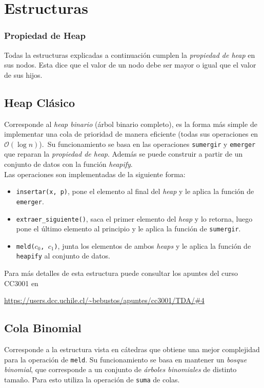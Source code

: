 \documentclass[dcc,uchile]{fcfmcourse}
\begin{document}
\section{Estructuras}
\subsubsection*{Propiedad de Heap}
Todas la estructuras explicadas a continuación cumplen la \textit{propiedad de heap} en sus nodos. Esta dice que el valor de un nodo debe ser mayor o igual que el valor de sus hijos.
\subsection{Heap Clásico}
Corresponde al \textit{heap binario} (árbol binario completo), es la forma más simple de implementar una cola de prioridad de manera eficiente (todas sus operaciones en $\mathcal{O}(\log{n})$).\ Su funcionamiento se basa en las operaciones \texttt{sumergir} y \texttt{emerger} que reparan la \textit{propiedad de heap}. Además se puede construir a partir de un conjunto de datos con la función \textit{heapify}.\\

Las operaciones son implementadas de la siguiente forma:

\begin{itemize}
    \item \texttt{insertar(x, p)}, pone el elemento al final del \textit{heap} y le aplica la función de \texttt{emerger}.
    \item \texttt{extraer\_siguiente()}, saca el primer elemento del \textit{heap} y lo retorna, luego pone el último elemento al principio y le aplica la función de \texttt{sumergir}.
    \item \texttt{meld($c_{0}$, $c_{1}$)}, junta los elementos de ambos \textit{heaps} y le aplica la función de \texttt{heapify} al conjunto de datos.
\end{itemize}
Para más detalles de esta estructura puede consultar los apuntes del curso CC3001 en\ 

\url{https://users.dcc.uchile.cl/~bebustos/apuntes/cc3001/TDA/#4}

\subsection{Cola Binomial}
Corresponde a la estructura vista en cátedras que obtiene una mejor complejidad para la operación de \texttt{meld}. Su funcionamiento se basa en mantener un \textit{bosque binomial}, que corresponde a un conjunto de \textit{árboles binomiales} de distinto tamaño. Para esto utiliza la operación de \texttt{suma} de colas.\\
\end{document}
